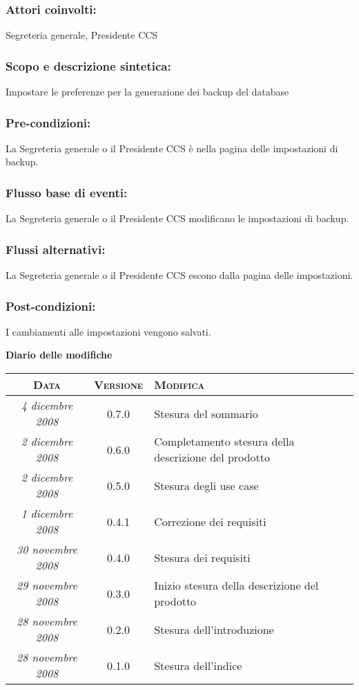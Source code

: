 \documentclass[11pt,a4paper]{article}
\newcommand{\modifiche} 
{
\newpage
\begin{center}
\textbf{Diario delle modifiche} \\
\bigskip
\begin{tabular}{|c|c|p{0.51\textwidth}|}
\hline
\textsc{Data} & \textsc{Versione} & \textsc{Modifica} \\
\hline
\hline
\textit{4 dicembre 2008} & 0.7.0 & Stesura del sommario \\
\hline
\textit{2 dicembre 2008} & 0.6.0 & Completamento stesura della descrizione del prodotto \\
\hline
\textit{2 dicembre 2008} & 0.5.0 & Stesura degli use case \\
\hline
\textit{1 dicembre 2008} & 0.4.1 & Correzione dei requisiti \\
\hline
\textit{30 novembre 2008} & 0.4.0 & Stesura dei requisiti \\
\hline
\textit{29 novembre 2008} & 0.3.0 & Inizio stesura della descrizione del prodotto \\
\hline
\textit{28 novembre 2008} & 0.2.0 & Stesura dell'introduzione \\
\hline
\textit{28 novembre 2008} & 0.1.0 & Stesura dell'indice \\
\hline
\end{tabular}
\end{center}
}
\begin{document}
\subsubsection*{Attori coinvolti:}
Segreteria generale, Presidente CCS
\subsubsection*{Scopo e descrizione sintetica:}
Impostare le preferenze per la generazione dei backup del database
\subsubsection*{Pre-condizioni:}
La Segreteria generale o il Presidente CCS è nella pagina delle impostazioni di backup.
\subsubsection*{Flusso base di eventi:}
La Segreteria generale o il Presidente CCS modificano le impostazioni di backup.
\subsubsection*{Flussi alternativi:}
La Segreteria generale o il Presidente CCS escono dalla pagina delle impostazioni.
\subsubsection*{Post-condizioni:}
I cambiamenti alle impostazioni vengono salvati.
\modifiche
\end{document}
